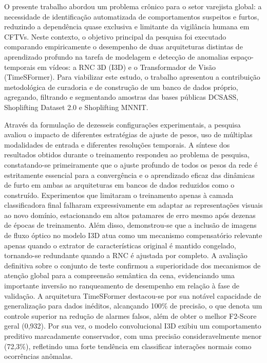 \documentclass[12pt, %
openright, 
oneside, %
a4paper,    %
brazil]{facom-ufu-abntex2}
\begin{document}
O presente trabalho abordou um problema crônico para o setor varejista global: a necessidade de identificação automatizada de comportamentos suspeitos e furtos, reduzindo a dependência quase exclusiva e limitante da vigilância humana em CFTVs. Neste contexto, o objetivo principal da pesquisa foi executado comparando empiricamente o desempenho de duas arquiteturas distintas de aprendizado profundo na tarefa de modelagem e detecção de anomalias espaço-temporais em vídeos: a RNC 3D (I3D) e o Transformador de Visão (TimeSFormer). Para viabilizar este estudo, o trabalho apresentou a contribuição metodológica de curadoria e de construção de um banco de dados próprio, agregando, filtrando e segmentando amostras das bases públicas DCSASS, Shoplifting Dataset 2.0 e Shoplifting MNNIT.

Através da formulação de dezesseis configurações experimentais, a pesquisa avaliou o impacto de diferentes estratégias de ajuste de pesos, uso de múltiplas modalidades de entrada e diferentes resoluções temporais. A síntese dos resultados obtidos durante o treinamento respondeu ao problema de pesquisa, constatando-se primeiramente que o ajuste profundo de todos os pesos da rede é estritamente essencial para a convergência e o aprendizado eficaz das dinâmicas de furto em ambas as arquiteturas em bancos de dados reduzidos como o construído. Experimentos que limitaram o treinamento apenas à camada classificadora final falharam expressivamente em adaptar as representações visuais ao novo domínio, estacionando em altos patamares de erro mesmo após dezenas de épocas de treinamento. Além disso, demonstrou-se que a inclusão de imagens de fluxo óptico no modelo I3D atua como um mecanismo compensatório relevante apenas quando o extrator de características original é mantido congelado, tornando-se redundante quando a RNC é ajustada por completo.  A avaliação definitiva sobre o conjunto de teste confirmou a superioridade dos mecanismos de atenção global para a compreensão semântica da cena, evidenciando uma importante inversão no ranqueamento de desempenho em relação à fase de validação. A arquitetura TimeSFormer destacou-se por sua notável capacidade de generalização para dados inéditos, alcançando 100\% de precisão, o que denota um controle superior na redução de alarmes falsos, além de obter o melhor F2-Score geral (0,932). Por sua vez, o modelo convolucional I3D exibiu um comportamento preditivo marcadamente conservador, com uma precisão consideravelmente menor (72,3\%), refletindo uma forte tendência em classificar interações normais como ocorrências anômalas.
\end{document}
